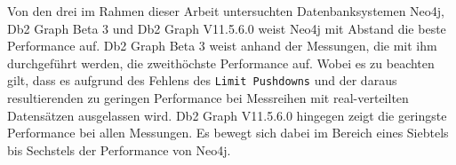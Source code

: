 Von den drei im Rahmen dieser Arbeit untersuchten Datenbanksystemen Neo4j, Db2 Graph Beta 3 und Db2 Graph V11.5.6.0 weist Neo4j mit Abstand die beste Performance auf. Db2 Graph Beta 3 weist anhand der Messungen, die mit ihm durchgeführt werden, die zweithöchste Performance auf. Wobei es zu beachten gilt, dass es aufgrund des Fehlens des \texttt{Limit Pushdowns} und der daraus resultierenden zu geringen Performance bei Messreihen mit real-verteilten Datensätzen ausgelassen wird. Db2 Graph V11.5.6.0 hingegen zeigt die geringste Performance bei allen Messungen. Es bewegt sich dabei im Bereich eines Siebtels bis Sechstels der Performance von Neo4j.